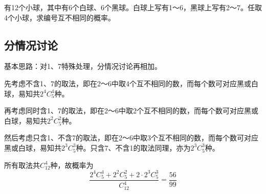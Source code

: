 

有12个小球，其中有6个白球、6个黑球。白球上写有1～6，黑球上写有2～7。任取4个小球，求编号互不相同的概率。


\subsection{分情况讨论}

基本思路：对1、7特殊处理，分情况讨论再相加。

先考虑不含1、7的取法，即在2～6中取4个互不相同的数，而每个数可对应黑或白球，易知共$2^4C^4_5$种。

再考虑同时含1、7的取法，即在2～6中取2个互不相同的数，而每个数可对应黑或白球，易知共$2^2C^2_5$种。

然后考虑只含1、不含7的取法，即在2～6中取3个互不相同的数，而每个数可对应黑或白球，易知共$2^3C^3_5$种。只含7、不含1的取法同理，亦为$2^3C^3_5$种。

所有取法共$C^4_{12}$种，故概率为
\[ \frac{2^4C^4_5 + 2^2C^2_5 + 2\cdot2^3C^3_5}{C^4_{12}} = \frac{56}{99} \]
